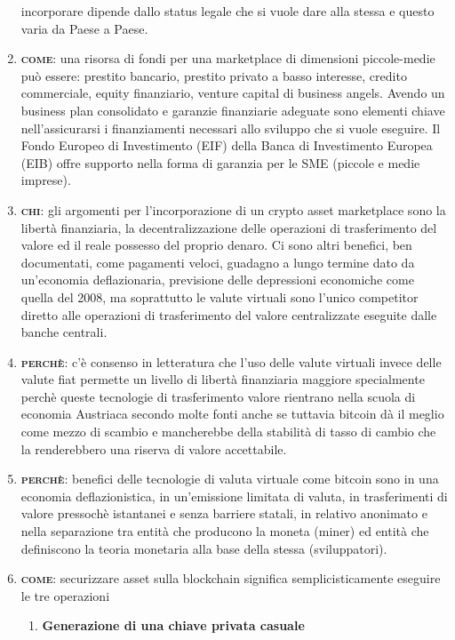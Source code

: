 \documentclass[11pt,fleqn]{book} %
\begin{document}
\begin{enumerate}
	incorporare dipende dallo status legale che si vuole dare alla stessa e questo varia da Paese a Paese.		
	\item \textbf{\textsc{come}}: una risorsa di fondi per una marketplace di dimensioni piccole-medie può essere: prestito bancario,
	prestito privato a basso interesse, credito commerciale, equity finanziario, venture capital di business angels. Avendo un
	business plan consolidato e garanzie finanziarie adeguate sono elementi chiave nell'assicurarsi i finanziamenti necessari
	allo sviluppo che si vuole eseguire. Il Fondo Europeo di Investimento (EIF) della Banca di Investimento Europea (EIB)
	offre supporto nella forma di garanzia per le SME (piccole e medie imprese).
	\item \textbf{\textsc{chi}}: gli argomenti per l'incorporazione di un crypto asset marketplace sono la libertà finanziaria, la
	decentralizzazione delle operazioni di trasferimento del valore ed il reale possesso del proprio denaro.
	Ci sono altri benefici, ben documentati, come pagamenti veloci, guadagno a lungo termine dato da un'economia deflazionaria, previsione
	delle depressioni economiche come quella del 2008, ma soprattutto le valute virtuali sono l'unico competitor diretto alle operazioni
	di trasferimento del valore centralizzate eseguite dalle banche centrali.
	\item \textbf{\textsc{perchè}}: c'è consenso in letteratura che l'uso delle valute virtuali invece delle valute fiat permette un livello di
	libertà finanziaria maggiore specialmente perchè queste tecnologie di trasferimento valore rientrano nella scuola
	di economia Austriaca \cite{austrianTheory} secondo molte fonti \cite{misesItalia} anche se tuttavia bitcoin dà il meglio come
	mezzo di scambio e mancherebbe della stabilità di tasso di cambio che la renderebbero una riserva di valore accettabile.
	\item \textbf{\textsc{perchè}}: benefici delle tecnologie di valuta virtuale come bitcoin sono in una economia deflazionistica,
	in un'emissione limitata di valuta, in trasferimenti di valore pressochè istantanei e senza barriere statali, in 
	relativo anonimato e nella separazione tra entità che producono la moneta (miner) ed entità che definiscono la teoria monetaria
	alla base della stessa (sviluppatori).
	\item \textbf{\textsc{come}}: securizzare asset sulla blockchain significa semplicisticamente eseguire le tre operazioni
		\begin{enumerate}[label*=\arabic*.]
			\item \textbf{Generazione di una chiave privata casuale}

\end{enumerate}
\end{enumerate}
\end{document}
